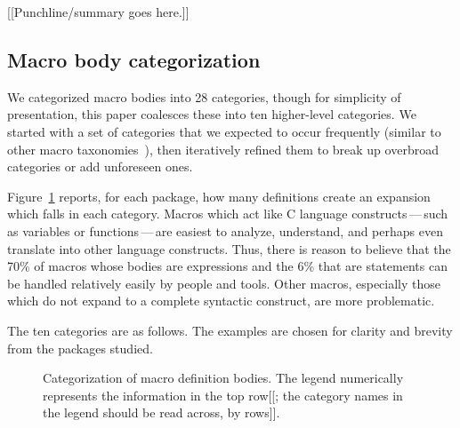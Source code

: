 \documentclass[10pt]{article}
\begin{document}
[[Punchline/summary goes here.]]



\subsection{Macro body categorization}

We categorized macro bodies into 28 categories, though for simplicity of
presentation, this paper coalesces these into ten higher-level categories.
We started with a set of categories that we expected to occur frequently
(similar to other macro
taxonomies~\cite{Stroustrup-DesignEvolution,Carroll95}), then iteratively
refined them to break up overbroad categories or add unforeseen ones.

Figure~\ref{fig:categorization} reports, for each package, how many
definitions create an expansion which falls in each category.  Macros which
act like C language constructs\,---\,such as variables or
functions\,---\,are easiest to analyze, understand, and perhaps even
translate into other language constructs.  Thus, there is reason to believe
that the 70\% of macros whose bodies are expressions and the 6\% that are
statements can be handled relatively easily by people and tools.  Other
macros, especially those which do not expand to a complete syntactic
construct, are more problematic.


The ten categories are as follows.  The examples are chosen for clarity
and brevity from the packages studied.


\begin{figure}
\centerline{}
\caption{Categorization of macro definition bodies.  The legend numerically
  represents the information in the top row[[; the category names in the
  legend should be read across, by rows]].}
\label{fig:categorization}
\end{figure}


{}


\end{document}
